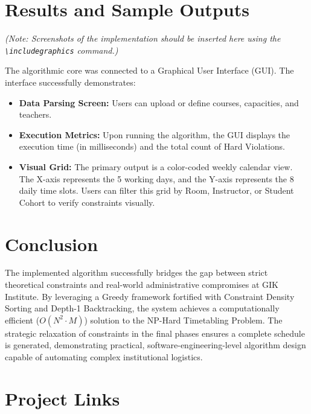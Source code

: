 \documentclass[12pt, a4paper]{article}
\begin{document}
\section{Results and Sample Outputs}

\textit{(Note: Screenshots of the implementation should be inserted here using the
\texttt{\textbackslash includegraphics} command.)}

\vspace{0.3cm}
\noindent The algorithmic core was connected to a Graphical User Interface (GUI). The
interface successfully demonstrates:

\begin{itemize}[topsep=4pt]
    \item \textbf{Data Parsing Screen:} Users can upload or define courses, capacities,
          and teachers.

    \item \textbf{Execution Metrics:} Upon running the algorithm, the GUI displays the
          execution time (in milliseconds) and the total count of Hard Violations.

    \item \textbf{Visual Grid:} The primary output is a color-coded weekly calendar
          view. The X-axis represents the 5 working days, and the Y-axis represents the
          8 daily time slots. Users can filter this grid by Room, Instructor, or Student
          Cohort to verify constraints visually.
\end{itemize}

\section{Conclusion}

The implemented algorithm successfully bridges the gap between strict theoretical
constraints and real-world administrative compromises at GIK Institute. By leveraging a
Greedy framework fortified with Constraint Density Sorting and Depth-1 Backtracking,
the system achieves a computationally efficient ($O(N^2 \cdot M)$) solution to the
NP-Hard Timetabling Problem. The strategic relaxation of constraints in the final phases
ensures a complete schedule is generated, demonstrating practical, software-engineering-level
algorithm design capable of automating complex institutional logistics.

\section{Project Links}
\end{document}
